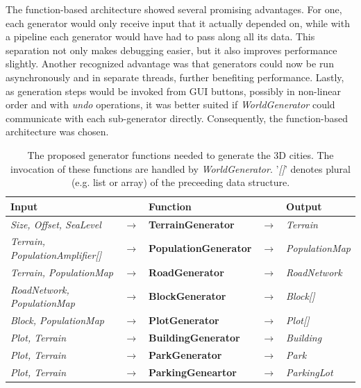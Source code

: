 The function-based architecture showed several promising advantages.
For one, each generator would only receive input that it actually depended on, while with a pipeline each generator would have had to pass along all its data.
This separation not only makes debugging easier, but it also improves performance slightly.
Another recognized advantage was that generators could now be run asynchronously and in separate threads, further benefiting performance.
Lastly, as generation steps would be invoked from GUI buttons, possibly in non-linear order and with \textit{undo} operations, it was better suited if \textit{WorldGenerator} could communicate with each sub-generator directly.
Consequently, the function-based architecture was chosen.

\begin{center}
  \begin{table}[H]
    \begin{tabular}{lllll}
      \textbf{Input}                           &               & \textbf{Function}            &               & \textbf{Output}         \\
      \midrule
      \textit{Size, Offset, SeaLevel}          & $\rightarrow$ & \textbf{TerrainGenerator}    & $\rightarrow$ & \textit{Terrain}        \\
      \textit{Terrain, PopulationAmplifier[]}  & $\rightarrow$ & \textbf{PopulationGenerator} & $\rightarrow$ & \textit{PopulationMap}  \\
      \textit{Terrain, PopulationMap}          & $\rightarrow$ & \textbf{RoadGenerator}       & $\rightarrow$ & \textit{RoadNetwork}    \\
      \textit{RoadNetwork, PopulationMap}      & $\rightarrow$ & \textbf{BlockGenerator}      & $\rightarrow$ & \textit{Block[]}        \\
      \textit{Block, PopulationMap}            & $\rightarrow$ & \textbf{PlotGenerator}       & $\rightarrow$ & \textit{Plot[]}         \\
      \textit{Plot, Terrain}                   & $\rightarrow$ & \textbf{BuildingGenerator}   & $\rightarrow$ & \textit{Building}       \\
      \textit{Plot, Terrain}                   & $\rightarrow$ & \textbf{ParkGenerator}       & $\rightarrow$ & \textit{Park}           \\
      \textit{Plot, Terrain}                   & $\rightarrow$ & \textbf{ParkingGeneartor}    & $\rightarrow$ & \textit{ParkingLot}     \\
      \bottomrule
    \end{tabular}

    \caption[]{The proposed generator functions needed to generate the 3D cities. The invocation of these functions are handled by \textit{WorldGenerator}. '\textit{[]}' denotes plural (e.g. list or array) of the preceeding data structure.}
    \label{table:generators}
  \end{table}
\end{center}
\vspace{-1.75cm}

